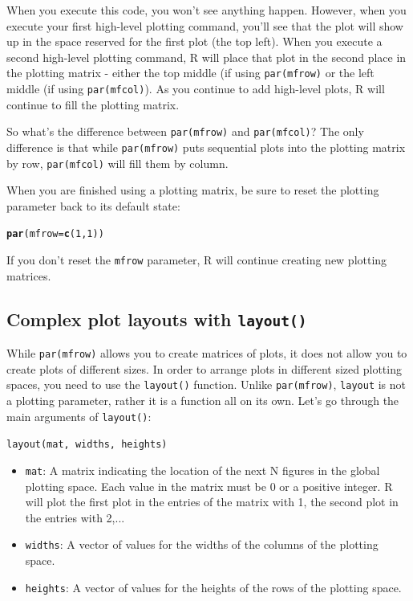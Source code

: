\documentclass{tufte-book}\usepackage[]{graphicx}\usepackage[]{color}
\makeatletter
\newcommand{\hlnum}[1]{\textcolor[rgb]{0.686,0.059,0.569}{#1}}%
\newcommand{\hlstd}[1]{\textcolor[rgb]{0.345,0.345,0.345}{#1}}%
\newcommand{\hlkwc}[1]{\textcolor[rgb]{0.333,0.667,0.333}{#1}}%
\newcommand{\hlkwd}[1]{\textcolor[rgb]{0.737,0.353,0.396}{\textbf{#1}}}%
\newenvironment{kframe}{%
 \def\at@end@of@kframe{}%
 \ifinner\ifhmode%
  \def\at@end@of@kframe{\end{minipage}}%
  \begin{minipage}{\columnwidth}%
 \fi\fi%
 \def\FrameCommand##1{\hskip\@totalleftmargin \hskip-\fboxsep
 \colorbox{shadecolor}{##1}\hskip-\fboxsep
     \hskip-\linewidth \hskip-\@totalleftmargin \hskip\columnwidth}%
 \MakeFramed {\advance\hsize-\width
   \@totalleftmargin\z@ \linewidth\hsize
   \@setminipage}}%
 {\par\unskip\endMakeFramed%
 \at@end@of@kframe}
\newenvironment{knitrout}{}{} %
\newcommand{\newfun}[1]{\begin{LARGE} \begin{center} \texttt{#1} \end{center} \end{LARGE}}
\makeatother
\begin{document}
When you execute this code, you won't see anything happen. However, when you execute your first high-level plotting command, you'll see that the plot will show up in the space reserved for the first plot (the top left). When you execute a second high-level plotting command, R will place that plot in the second place in the plotting matrix - either the top middle (if using \texttt{par(mfrow)} or the left middle (if using \texttt{par(mfcol)}). As you continue to add high-level plots, R will continue to fill the plotting matrix.

So what's the difference between \texttt{par(mfrow)} and \texttt{par(mfcol)}? The only difference is that while \texttt{par(mfrow)} puts sequential plots into the plotting matrix by row, \texttt{par(mfcol)} will fill them by column.

When you are finished using a plotting matrix, be sure to reset the plotting parameter back to its default state:

\begin{knitrout}
\color{fgcolor}\begin{kframe}
\begin{alltt}
\hlkwd{par}\hlstd{(}\hlkwc{mfrow} \hlstd{=} \hlkwd{c}\hlstd{(}\hlnum{1}\hlstd{,} \hlnum{1}\hlstd{))}
\end{alltt}
\end{kframe}
\end{knitrout}

If you don't reset the \texttt{mfrow} parameter, R will continue creating new plotting matrices.

\subsection{Complex plot layouts with \texttt{layout()}}

While \texttt{par(mfrow)} allows you to create matrices of plots, it does not allow you to create plots of different sizes. In order to arrange plots in different sized plotting spaces, you need to use the \texttt{layout()} function. Unlike \texttt{par(mfrow)}, \texttt{layout} is not a plotting parameter, rather it is a function all on its own. Let's go through the main arguments of \texttt{layout()}:

\newfun{layout(mat, widths, heights)}

\begin{itemize}

  \item \texttt{mat}: A matrix indicating the location of the next N figures in the global plotting space. Each value in the matrix must be 0 or a positive integer. R will plot the first plot in the entries of the matrix with 1, the second plot in the entries with 2,...
  \item \texttt{widths}: A vector of values for the widths of the columns of the plotting space.
  \item \texttt{heights}: A vector of values for the heights of the rows of the plotting space.

\end{itemize}
\end{document}
